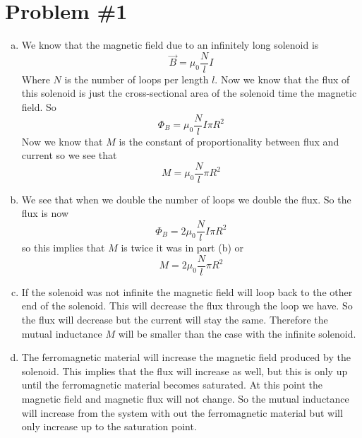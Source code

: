 \documentclass[11pt]{article}
\numberwithin{equation}{section}
\begin{document}

\section{Problem \#1}
\begin{enumerate}[(a)]
\item
We know that the magnetic field due to an infinitely long solenoid is
$$\vec{B} = \mu_0\frac{N}{l}I$$
Where $N$ is the number of loops per length $l$. Now we know that the flux of this solenoid is just the cross-sectional area of the solenoid time the magnetic field. So
$$\Phi_B = \mu_0\frac{N}{l}I\pi R^2$$
Now we know that $M$ is the constant of proportionality between flux and current so we see that
$$M = \mu_0\frac{N}{l}\pi R^2$$

\item
We see that when we double the number of loops we double the flux. So the flux is now
$$\Phi_B = 2\mu_0\frac{N}{l}I\pi R^2$$
so this implies that $M$ is twice it was in part (b) or
$$M = 2\mu_0\frac{N}{l}\pi R^2$$

\item
If the solenoid was not infinite the magnetic field will loop back to the other end of the solenoid. This will decrease the flux through the loop we have. So the flux will decrease but the current will stay the same. Therefore the mutual inductance $M$ will be smaller than the case with the infinite solenoid.

\item
The ferromagnetic material will increase the magnetic field produced by the solenoid. This implies that the flux will increase as well, but this is only up until the ferromagnetic material becomes saturated. At this point the magnetic field and magnetic flux will not change. So the mutual inductance will increase from the system with out the ferromagnetic material but will only increase up to the saturation point.
\end{enumerate}
\end{document}
